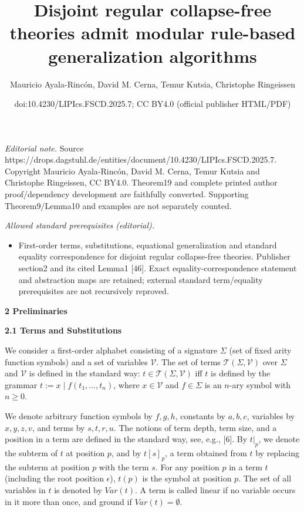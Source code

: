 \documentclass[10pt,a4paper]{amsart}
\title{Disjoint regular collapse-free theories admit modular rule-based generalization algorithms}
\author{Mauricio Ayala-Rincón, David M. Cerna, Temur Kutsia, Christophe Ringeissen}
\date{doi:10.4230/LIPIcs.FSCD.2025.7; CC BY4.0 (official publisher HTML/PDF)}
\begin{document}
\maketitle
\noindent\textit{Editorial note.} Source https://drops.dagstuhl.de/entities/document/10.4230/LIPIcs.FSCD.2025.7. Copyright Mauricio Ayala-Rincón, David M. Cerna, Temur Kutsia and Christophe Ringeissen, CC BY4.0. Theorem19 and complete printed author proof/dependency development are faithfully converted. Supporting Theorem9/Lemma10 and examples are not separately counted.\par\medskip
\noindent\textit{Allowed standard prerequisites (editorial).}\begin{itemize}
\item First-order terms, substitutions, equational generalization and standard equality correspondence for disjoint regular collapse-free theories. Publisher section2 and its cited Lemma1 [46]. Exact equality-correspondence statement and abstraction maps are retained; external standard term/equality prerequisites are not recursively reproved.
\end{itemize}\medskip
 
\par\medskip\noindent\textbf{2 Preliminaries}\par
 
 
\par\medskip\noindent\textbf{2.1 Terms and Substitutions}\par
 
 
We consider a first-order alphabet consisting of a signature $\Sigma$ (set of fixed arity function symbols) and a set of variables $\mathcal{V}$. The set of terms $\mathcal{T}(\Sigma,\mathcal{V})$ over $\Sigma$ and $\mathcal{V}$ is defined in the standard way: $t\in\mathcal{T}(\Sigma,\mathcal{V})$ iff $t$ is defined by the grammar $t:=x\mid f(t_{1},\ldots,t_{n})$, where $x\in\mathcal{V}$ and $f\in\Sigma$ is an $n$-ary symbol with $n\geq 0$.\par
 
 
 
We denote arbitrary function symbols by $f,g,h$, constants by $a,b,c$, variables by $x,y,z,v$, and terms by $s,t,r,u$. The notions of term depth, term size, and a position in a term are defined in the standard way, see, e.g., [6]. By $t|_{p}$, we denote the subterm of $t$ at position $p$, and by $t[s]_{p}$, a term obtained from $t$ by replacing the subterm at position $p$ with the term $s$. For any position $p$ in a term $t$ (including the root position $\epsilon$), $t(p)$ is the symbol at position $p$. The set of all variables in $t$ is denoted by $\mathit{Var}(t)$. A term is called linear if no variable occurs in it more than once, and ground if $\mathit{Var}(t)=\emptyset$.\par
 
\end{document}
